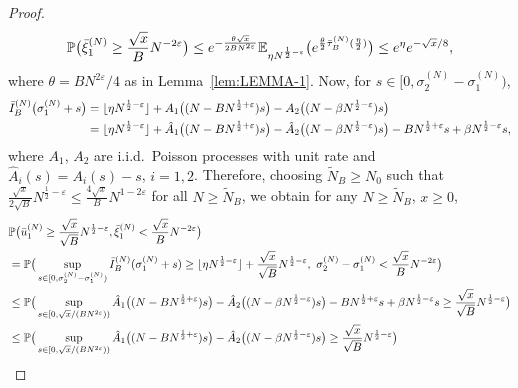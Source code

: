 \documentclass[11pt, reqno]{article}
\numberwithin{equation}{section}
\numberwithin{theorem}{section}
\begin{document}
\begin{appendix}
\begin{proof}
\begin{equation}
    \mathbb{P}\big(\Bar{\xi}^{(N)}_1\geq \frac{\sqrt{x}}{B}N^{-2\varepsilon}\big)\leq e^{-\frac{\theta \sqrt{x}}{2B N^{2\varepsilon}}}\mathbb{E}_{\eta N^{\frac{1}{2}-\varepsilon}}\big(e^{\frac{\theta}{2}\Bar{\tau}^{(N)}_B(\frac{\eta}{2})}\big)\leq e^{\eta}e^{-\sqrt{x}/8},
\end{equation}
where $\theta= BN^{2\varepsilon}/4$ as in Lemma~\ref{lem:LEMMA-1}.
Now, for $s\in[0, \sigma^{(N)}_2 - \sigma^{(N)}_1)$,
\begin{align*}
    \Bar{I}_B^{(N)}\big(\sigma^{(N)}_1+s\big)&= \lfloor \eta N^{\frac{1}{2}-\varepsilon}\rfloor +A_1\big((N-BN^{\frac{1}{2}+\varepsilon})s\big)-A_2\big((N-\beta N^{\frac{1}{2}-\varepsilon})s\big)\\
    &= \lfloor \eta N^{\frac{1}{2}-\varepsilon}\rfloor +\hat{A}_1\big((N-BN^{\frac{1}{2}+\varepsilon})s\big)-\hat{A}_2\big((N-\beta N^{\frac{1}{2}-\varepsilon})s\big)-BN^{\frac{1}{2}+\varepsilon}s+\beta N^{\frac{1}{2}-\varepsilon}s,
\end{align*}
where $A_1$, $A_2$ are i.i.d.~Poisson processes with unit rate and $\hat{A}_i(s)=A_i(s)-s$, $i=1,2$.
Therefore, choosing $\tilde N_B \ge N_0$ such that $\frac{\sqrt{x}}{2\sqrt{B}}N^{\frac{1}{2}-\varepsilon} \le \frac{4\sqrt{x}}{B}N^{1-2\varepsilon}$ for all $N \ge \tilde N_B$, we obtain for any $N \ge \tilde N_B$, $x \ge 0$,
\begin{equation}\label{eq:sup-IB}
\begin{split}
    &\mathbb{P}\big(\Bar{u}^{(N)}_1\geq \frac{\sqrt{x}}{\sqrt{B}}N^{\frac{1}{2}-\varepsilon},\Bar{\xi}^{(N)}_1<\frac{\sqrt{x}}{B}N^{-2\varepsilon}\big)\\
    &=\mathbb{P}\big(\sup_{s\in[0, \sigma^{(N)}_2 - \sigma^{(N)}_1)}\Bar{I}_B^{(N)}(\sigma^{(N)}_1+s)\geq \lfloor \eta N^{\frac{1}{2}-\varepsilon}\rfloor +\frac{\sqrt{x}}{\sqrt{B}}N^{\frac{1}{2}-\varepsilon},\  \sigma^{(N)}_2 - \sigma^{(N)}_1 < \frac{\sqrt{x}}{B}N^{-2\varepsilon}\big)\\
     &\leq \mathbb{P}\big(\sup_{s\in[0,\sqrt{x}/(BN^{2\varepsilon}))} \hat{A}_1\big((N-BN^{\frac{1}{2}+\varepsilon})s\big)-\hat{A}_2\big((N-\beta N^{\frac{1}{2}-\varepsilon})s\big)-BN^{\frac{1}{2}+\varepsilon}s+\beta N^{\frac{1}{2}-\varepsilon}s\geq \frac{\sqrt{x}}{\sqrt{B}}N^{\frac{1}{2}-\varepsilon}\big)\\
     & \leq \mathbb{P}\big(\sup_{s\in[0,\sqrt{x}/(BN^{2\varepsilon}))}\hat{A}_1\big((N-BN^{\frac{1}{2}+\varepsilon})s\big)-\hat{A}_2\big((N-\beta N^{\frac{1}{2}-\varepsilon})s\big)\geq \frac{\sqrt{x}}{\sqrt{B}}N^{\frac{1}{2}-\varepsilon}\big)\\

\end{split}
\end{equation}
\end{proof}
\end{appendix}
\end{document}
